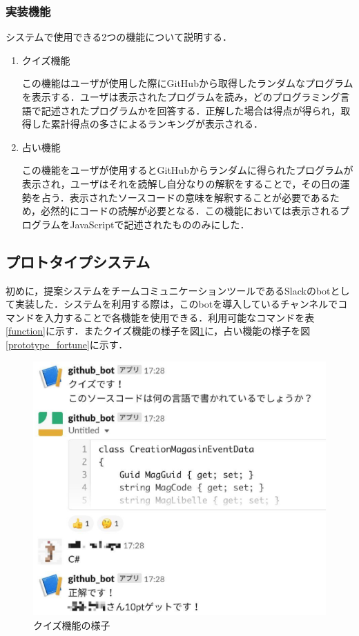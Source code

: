 \subsubsection{実装機能}
システムで使用できる2つの機能について説明する．
\begin{enumerate}
  \item クイズ機能

  この機能はユーザが使用した際にGitHubから取得したランダムなプログラムを表示する．ユーザは表示されたプログラムを読み，どのプログラミング言語で記述されたプログラムかを回答する．正解した場合は得点が得られ，取得した累計得点の多さによるランキングが表示される．

  \item 占い機能

  この機能をユーザが使用するとGitHubからランダムに得られたプログラムが表示され，ユーザはそれを読解し自分なりの解釈をすることで，その日の運勢を占う．表示されたソースコードの意味を解釈することが必要であるため，必然的にコードの読解が必要となる．この機能においては表示されるプログラムをJavaScriptで記述されたもののみにした．

\end{enumerate}
\subsection{プロトタイプシステム}
初めに，提案システムをチームコミュニケーションツールであるSlackのbotとして実装した．システムを利用する際は，このbotを導入しているチャンネルでコマンドを入力することで各機能を使用できる．利用可能なコマンドを表\ref{function}に示す．またクイズ機能の様子を図\ref{prototype_quiz}に，占い機能の様子を図\ref{prototype_fortune}に示す．

\begin{figure}[!ht]
  \begin{center}
    \includegraphics[width=0.6\linewidth]{image/prototype_quiz.eps}
  \end{center}
  \caption{クイズ機能の様子}
  \label{prototype_quiz}
\end{figure}

